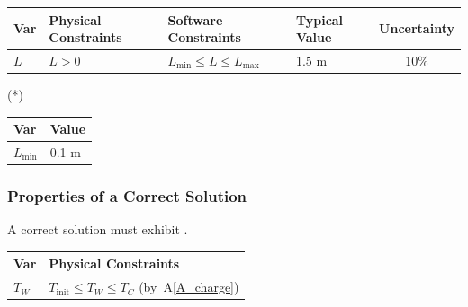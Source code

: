 \documentclass[12pt]{article}
\newcommand{\aref}[1]{A\ref{#1}}
\begin{document}
\begin{table}[!h]
    \caption{Input Variables} \label{TblInputVar}
    \renewcommand{\arraystretch}{1.2}
    \noindent \begin{longtable*}{l l l l c}
        \toprule
        \textbf{Var} & \textbf{Physical Constraints} & \textbf{Software Constraints} &
        \textbf{Typical Value} & \textbf{Uncertainty}\\
        \midrule
        $L$ & $L > 0$ & $L_{\text{min}} \leq L \leq L_{\text{max}}$ & 1.5 \si[per-mode=symbol] {\metre} & 10\%
        \\
        \bottomrule
    \end{longtable*}
\end{table}

\noindent
\begin{description}
    \item[(*)] 
\end{description}

\begin{table}[!h]
    \caption{Specification Parameter Values} \label{TblSpecParams}
    \renewcommand{\arraystretch}{1.2}
    \noindent \begin{longtable*}{l l}
        \toprule
        \textbf{Var} & \textbf{Value} \\
        \midrule
        $L_\text{min}$ & 0.1 \si{\metre}\\
        \bottomrule
    \end{longtable*}
\end{table}

\subsubsection{Properties of a Correct Solution} \label{sec_CorrectSolution}

\noindent
A correct solution must exhibit .  

\begin{table}[!h]
    \caption{Output Variables} \label{TblOutputVar}
    \renewcommand{\arraystretch}{1.2}
    \noindent \begin{longtable*}{l l}
        \toprule
        \textbf{Var} & \textbf{Physical Constraints} \\
        \midrule
        $T_W$ & $T_\text{init} \leq T_W \leq T_C$ (by~\aref{A_charge})
        \\
        \bottomrule
    \end{longtable*}
\end{table}
\end{document}

